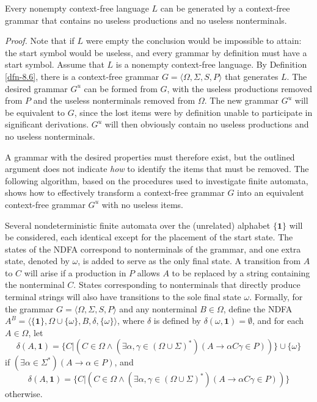 \begin{thm}\label{thm-9.3}
Every nonempty context-free language $L$ can be generated by a context-free
grammar that contains no useless productions and no useless nonterminals.

\emph{Proof.} Note that if $L$ were empty the conclusion would be impossible to
attain: the start symbol would be useless, and every grammar by definition must
have a start symbol. Assume that $L$ is a nonempty context-free language. By
Definition \ref{dfn-8.6}, there is a context-free grammar $G=\langle\Omega,\Sigma,S,P
\rangle$ that generates $L$. The desired grammar $G^u$ can be formed from $G$,
with the useless productions removed from $P$ and the useless nonterminals
removed from $\Omega$. The new grammar $G^u$ will be equivalent to $G$, since
the lost items were by definition unable to participate in significant
derivations. $G^u$ will then obviously contain no useless productions and no
useless nonterminals.

A grammar with the desired properties must therefore exist, but the outlined
argument does not indicate \emph{how} to identify the items that must be removed.
The following algorithm, based on the procedures used to investigate finite
automata, shows how to effectively transform a context-free grammar $G$ into an
equivalent context-free grammar $G^u$ with no useless items.

Several nondeterministic finite automata over the (unrelated) alphabet $\{\pmb{1}\}$
will be considered, each identical except for the placement of the start state.
The states of the NDFA correspond to nonterminals of the grammar, and one extra
state, denoted by $\omega$, is added to serve as the only final state. A
transition from $A$ to $C$ will arise if a production in $P$ allows $A$ to be
replaced by a string containing the nonterminal $C$. States corresponding to
nonterminals that directly produce terminal strings will also have transitions
to the sole final state $\omega$. Formally, for the grammar $G=\langle\Omega,
\Sigma,S,P\rangle$ and any nonterminal $B\in\Omega$, define the NDFA $A^B =
\langle\{\pmb{1}\},\Omega\cup\{\omega\},B,\delta,\{\omega\}\rangle$, where
$\delta$ is defined by $\delta(\omega,\pmb{1})=\emptyset$, and for each $A \in
\Omega$, let
\[ \delta(A,\pmb{1})=\{C|(C\in\Omega\wedge(\exists\alpha,\gamma\in(\Omega\cup
	\Sigma)^*)(A\rightarrow\alpha C\gamma\in P))\}\cup\{\omega\} \]
if $(\exists\alpha\in\Sigma^*)(A\rightarrow\alpha\in P)$, and
\[ \delta(A,\pmb{1})=\{C|(C\in\Omega\wedge(\exists\alpha,\gamma\in(\Omega\cup
	\Sigma)^*)(A\rightarrow\alpha C\gamma\in P))\} \]
otherwise.


\end{thm}
